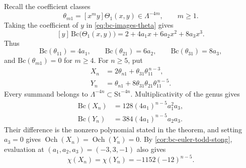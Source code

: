 \documentclass[14pt,dvipsnames]{extarticle}
\makeatletter
\numberwithin{equation}{subsection}
\theoremstyle{plain}
\theoremstyle{definition}
\theoremstyle{definition}
\renewenvironment{proof}[1][\proofname]{
 \par\pushQED{\qed}\normalfont
 \topsep6\p@\@plus6\p@\relax
 \trivlist\item[\hskip\labelsep\bfseries\itshape #1\@addpunct{.}]
}{\popQED\endtrivlist\@endpefalse}
\DeclareMathOperator{\Och}{Och}
\newcommand{\Bc}{\mathrm{Bc}}
\newcommand{\St}{\mathrm{St}}
\makeatother
\begin{document}
\begin{proof}[Proof of \cref{thm:bc-not-determined}]
Recall the coefficient classes
\[
 \theta_{m1}=[x^m y]\Theta_1(x,y)\in\Lambda^{-4m},\qquad m\geq1.
\]
Taking the coefficient of $y$ in \eqref{eq:bc-images-theta} gives
\[
 [y]\,\Bc\bigl(\Theta_1(x,y)\bigr)
 =2+4a_1x+6a_2x^2+8a_3x^3.
\]
Thus
\[
 \Bc(\theta_{11})=4a_1,\qquad
 \Bc(\theta_{21})=6a_2,\qquad
 \Bc(\theta_{31})=8a_3,
\]
and $\Bc(\theta_{m1})=0$ for $m\geq4$. For $n\geq5$, put
\begin{equation}\label{eq:undecomposable-comparison-classes}
 \begin{aligned}
  X_n&=2\theta_{n1}+\theta_{31}\theta_{11}^{\,n-3},\\
  Y_n&=\theta_{n1}+8\theta_{31}\theta_{21}\theta_{11}^{\,n-5}.
 \end{aligned}
\end{equation}
Every summand belongs to $\Lambda^{-4n}\subset\St^{-4n}$. Multiplicativity
of the genus gives
\[
 \begin{aligned}
  \Bc(X_n)&=128(4a_1)^{n-5}a_1^2a_3,\\
  \Bc(Y_n)&=384(4a_1)^{n-5}a_2a_3.
 \end{aligned}
\]
Their difference is the nonzero polynomial stated in the theorem, and
setting $a_3=0$ gives $\Och(X_n)=\Och(Y_n)=0$. By
\cref{cor:bc-euler-todd-stong}, evaluation at $(a_1,a_2,a_3)=(-3,3,-1)$
also gives
\[
 \chi(X_n)=\chi(Y_n)=-1152(-12)^{n-5}.
\]


\end{proof}
\end{document}
